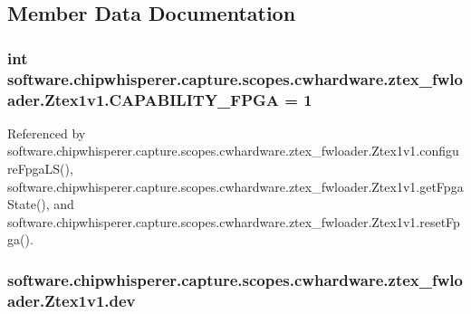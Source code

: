 \subsection{Member Data Documentation}
\hypertarget{classsoftware_1_1chipwhisperer_1_1capture_1_1scopes_1_1cwhardware_1_1ztex__fwloader_1_1Ztex1v1_a6052fb96d805e899a0c386e491ddbf2c}{}
\subsubsection[{C\+A\+P\+A\+B\+I\+L\+I\+T\+Y\+\_\+\+F\+P\+G\+A}]{\setlength{\rightskip}{0pt plus 5cm}int software.\+chipwhisperer.\+capture.\+scopes.\+cwhardware.\+ztex\+\_\+fwloader.\+Ztex1v1.\+C\+A\+P\+A\+B\+I\+L\+I\+T\+Y\+\_\+\+F\+P\+G\+A = 1\hspace{0.3cm}{\ttfamily [static]}}\label{classsoftware_1_1chipwhisperer_1_1capture_1_1scopes_1_1cwhardware_1_1ztex__fwloader_1_1Ztex1v1_a6052fb96d805e899a0c386e491ddbf2c}


Referenced by software.\+chipwhisperer.\+capture.\+scopes.\+cwhardware.\+ztex\+\_\+fwloader.\+Ztex1v1.\+configure\+Fpga\+L\+S(), software.\+chipwhisperer.\+capture.\+scopes.\+cwhardware.\+ztex\+\_\+fwloader.\+Ztex1v1.\+get\+Fpga\+State(), and software.\+chipwhisperer.\+capture.\+scopes.\+cwhardware.\+ztex\+\_\+fwloader.\+Ztex1v1.\+reset\+Fpga().

\hypertarget{classsoftware_1_1chipwhisperer_1_1capture_1_1scopes_1_1cwhardware_1_1ztex__fwloader_1_1Ztex1v1_aaeaeaeb302885b29639eec0faa341cc3}{}
\subsubsection[{dev}]{\setlength{\rightskip}{0pt plus 5cm}software.\+chipwhisperer.\+capture.\+scopes.\+cwhardware.\+ztex\+\_\+fwloader.\+Ztex1v1.\+dev}\label{classsoftware_1_1chipwhisperer_1_1capture_1_1scopes_1_1cwhardware_1_1ztex__fwloader_1_1Ztex1v1_aaeaeaeb302885b29639eec0faa341cc3}


